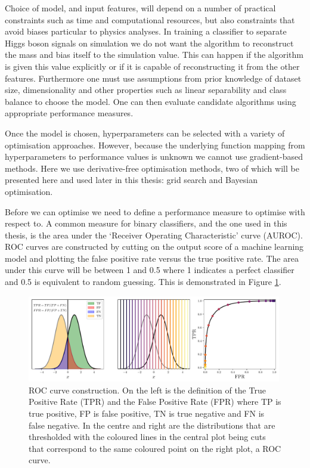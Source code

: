 Choice of model, and input features, will depend on a number of practical constraints such as time and computational resources, but also constraints that avoid biases particular to physics analyses. 
In training a classifier to separate Higgs boson signals on simulation we do not want the algorithm to reconstruct the mass and bias itself to the simulation value. This can happen if the algorithm is given this value explicitly or if it is capable of reconstructing it from the other features.  
Furthermore one must use assumptions from prior knowledge of dataset size, dimensionality and other properties such as linear separability and class balance to choose the model. One can then evaluate candidate algorithms using appropriate performance measures. 


Once the model is chosen, hyperparameters can be selected with a variety of optimisation approaches. However, because the underlying function mapping from hyperparameters to performance values is unknown we cannot use gradient-based methods. Here we use derivative-free optimisation methods, two of which will be presented here and used later in this thesis: grid search and Bayesian optimisation. 

Before we can optimise we need to define a performance measure to optimise with respect to. A common measure for binary classifiers, and the one used in this thesis, is the area under the `Receiver Operating Characteristic' curve (AUROC).
ROC curves are constructed by cutting on the output score of a machine learning model and plotting the false positive rate versus the true positive rate. The area under this curve will be between 1 and 0.5 where 1 indicates a perfect classifier and 0.5 is equivalent to random guessing. This is demonstrated in Figure \ref{fig:machine_learning:ROC_curve}. 
\begin{figure}[h!]
    \begin{center}
        \includegraphics[width=0.99\textwidth]{figures/machine_learning/ROC_figure.pdf}
    \end{center}
    \caption{ROC curve construction. On the left is the definition of the True Positive Rate (TPR) and the False Positive Rate (FPR) where TP is true positive, FP is false positive, TN is true negative and FN is false negative. In the centre and right are the distributions that are thresholded with the coloured lines in the central plot being cuts that correspond to the same coloured point on the right plot, a ROC curve. }
        \label{fig:machine_learning:ROC_curve}
\end{figure}


